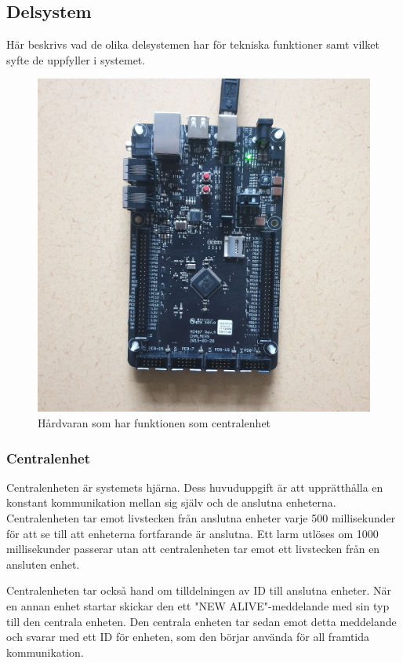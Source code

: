 \documentclass{article}
\begin{document}
\subsection{Delsystem}
Här beskrivs vad de olika delsystemen har för tekniska funktioner samt vilket syfte de uppfyller i systemet.

\begin{figure}[h]
    \centering
    \includegraphics[scale=0.05]{Projektrapport/central.png}
    \caption {Hårdvaran som har funktionen som centralenhet}
    \label{fig:drawing}
\end{figure}

\subsubsection{Centralenhet}
Centralenheten är systemets hjärna. Dess huvuduppgift är att upprätthålla en konstant kommunikation mellan sig själv och de anslutna enheterna. Centralenheten tar emot livstecken från anslutna enheter varje 500 millisekunder för att se till att enheterna fortfarande är anslutna. Ett larm utlöses om 1000 millisekunder passerar utan att centralenheten tar emot ett livstecken från en ansluten enhet.

Centralenheten tar också hand om tilldelningen av ID till anslutna enheter. När en annan enhet startar skickar den ett "NEW ALIVE"-meddelande med sin typ till den centrala enheten. Den centrala enheten tar sedan emot detta meddelande och svarar med ett ID för enheten, som den börjar använda för all framtida kommunikation.
\end{document}
